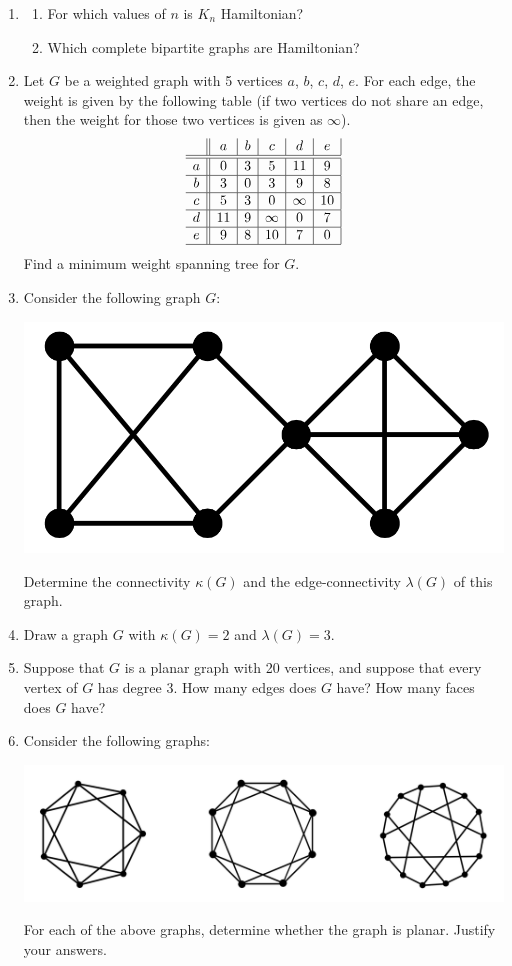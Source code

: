 \documentclass{article}
\renewcommand{\arraystretch}{1.5}
\begin{document}
\begin{enumerate}
	\item 
		\begin{enumerate}
			\item For which values of $n$ is $K_n$ Hamiltonian?
			\item Which complete bipartite graphs are Hamiltonian?
		\end{enumerate}

	\item Let $G$ be a weighted graph with 5 vertices $a$, $b$, $c$, $d$, $e$. For each edge, the weight is given by the following table (if two vertices do not share an edge, then the weight for those two vertices is given as $\infty$).
	\renewcommand{\arraystretch}{1.5}
			\[
			\begin{array}{c||c|c|c|c|c|}
			  & a & b & c & d & e \\
			\hline \hline
			a & 0 & 3 & 5 & 11 & 9 \\
			\hline  
			b & 3 & 0 & 3 & 9 & 8 \\
			\hline   
			c & 5 & 3 & 0 & \infty & 10 \\
			\hline 
			d & 11 & 9 & \infty & 0 & 7 \\
			\hline 
			e & 9 & 8 & 10 & 7 & 0 \\
			\hline  
			\end{array}
			\]
	Find a minimum weight spanning tree for $G$.

	\item Consider the following graph $G$:
	\begin{center}	
		\includegraphics[width=.3\textwidth]{quiz-pic-4.png}
	\end{center}		
	Determine the connectivity $\kappa(G)$ and the edge-connectivity $\lambda(G)$ of this graph.

	\item Draw a graph $G$ with $\kappa(G)=2$ and $\lambda(G)=3$. 

	\item Suppose that $G$ is a planar graph with 20 vertices, and suppose that every vertex of $G$ has degree 3. How many edges does $G$ have? How many faces does $G$ have?

	\item Consider the following graphs:
	\begin{center}	
		\includegraphics[width=.6\textwidth]{quiz-pic-5.png}
	\end{center}		
	For each of the above graphs, determine whether the graph is planar. Justify your answers.




\end{enumerate}
\end{document}
